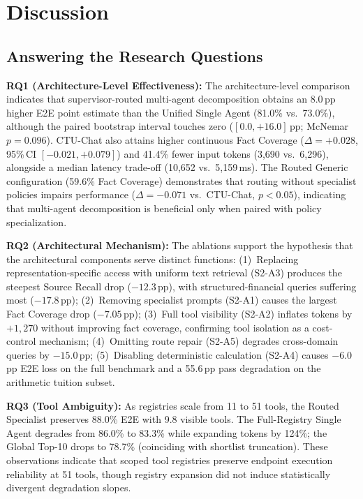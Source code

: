 \section{Discussion}
\label{sec:discussion}

\subsection{Answering the Research Questions}

\textbf{RQ1 (Architecture-Level Effectiveness):}
The architecture-level comparison indicates that supervisor-routed multi-agent decomposition obtains an 8.0\,pp higher E2E point estimate than the Unified Single Agent (81.0\% vs.\ 73.0\%), although the paired bootstrap interval touches zero ($[0.0, +16.0]$\,pp; McNemar $p{=}0.096$). CTU-Chat also attains higher continuous Fact Coverage ($\Delta{=}+0.028$, 95\%\,CI $[-0.021,+0.079]$) and 41.4\% fewer input tokens (3{,}690 vs.\ 6{,}296), alongside a median latency trade-off (10{,}652 vs.\ 5{,}159\,ms). The Routed Generic configuration (59.6\% Fact Coverage) demonstrates that routing without specialist policies impairs performance ($\Delta{=}-0.071$ vs.\ CTU-Chat, $p{<}0.05$), indicating that multi-agent decomposition is beneficial only when paired with policy specialization.

\textbf{RQ2 (Architectural Mechanism):}
The ablations support the hypothesis that the architectural components serve distinct functions:
(1)~Replacing representation-specific access with uniform text retrieval (S2-A3) produces the steepest Source Recall drop ($-12.3$\,pp), with structured-financial queries suffering most ($-17.8$\,pp);
(2)~Removing specialist prompts (S2-A1) causes the largest Fact Coverage drop ($-7.05$\,pp);
(3)~Full tool visibility (S2-A2) inflates tokens by $+1{,}270$ without improving fact coverage, confirming tool isolation as a cost-control mechanism;
(4)~Omitting route repair (S2-A5) degrades cross-domain queries by $-15.0$\,pp;
(5)~Disabling deterministic calculation (S2-A4) causes $-6.0$\,pp E2E loss on the full benchmark and a 55.6\,pp pass degradation on the arithmetic tuition subset.

\textbf{RQ3 (Tool Ambiguity):}
As registries scale from 11 to 51 tools, the Routed Specialist preserves 88.0\% E2E with 9.8 visible tools. The Full-Registry Single Agent degrades from 86.0\% to 83.3\% while expanding tokens by 124\%; the Global Top-10 drops to 78.7\% (coinciding with shortlist truncation). These observations indicate that scoped tool registries preserve endpoint execution reliability at 51 tools, though registry expansion did not induce statistically divergent degradation slopes.


